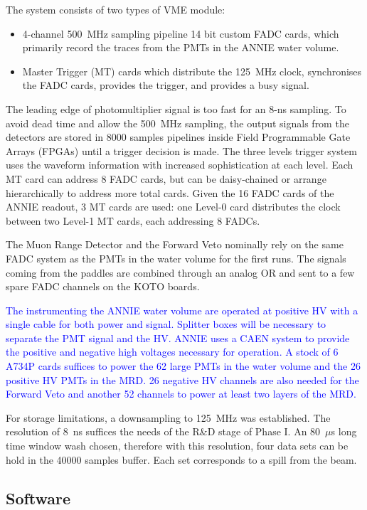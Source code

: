 The system consists of two types of VME module:
\begin{itemize}
  \item 4-channel 500~MHz sampling pipeline 14 bit custom FADC cards, which primarily record %
    the traces from the PMTs in the ANNIE water volume.
  \item Master Trigger (MT) cards which distribute the 125~MHz clock, synchronises the FADC %
    cards, provides the trigger, and provides a busy signal.
\end{itemize}

The leading edge of photomultiplier signal is too fast for an 8-ns sampling.
To avoid dead time and allow the 500~MHz sampling, the output signals from the detectors %
are stored in 8000 samples pipelines inside Field Programmable Gate Arrays (FPGAs) until %
a trigger decision is made.
The three levels trigger system uses the waveform information with increased %
sophistication at each level.
Each MT card can address 8 FADC cards, but can be daisy-chained or arrange hierarchically to %
address more total cards.
Given the 16 FADC cards of the ANNIE readout, 3 MT cards are used: %
one Level-0 card distributes the clock between two Level-1 MT cards, each addressing 8 FADCs.

The Muon Range Detector and the Forward Veto nominally rely on the same FADC system as %
the PMTs in the water volume for the first runs.
The signals coming from the paddles are combined through an analog OR and sent to a %
few spare FADC channels on the KOTO boards. 

\textcolor{blue}{
The instrumenting the ANNIE water volume are operated at positive HV with a %
single cable for both power and signal.
Splitter boxes will be necessary to separate the PMT signal and the HV.
ANNIE uses a CAEN system to provide the positive and negative high voltages necessary for operation. 
A stock of 6 A734P cards suffices to power the 62 large PMTs in the water volume %
and the 26 positive HV PMTs in the MRD.
26 negative HV channels are also needed for the Forward Veto and another 52 channels to power %
at least two layers of the MRD.
}

For storage limitations, a downsampling to 125~MHz was established.
The resolution of 8~ns suffices the needs of the R\&D stage of Phase I.
An 80~$\mu$s long time window wash chosen, therefore with this resolution, four data sets can be %
hold in the 40000 samples buffer.
Each set corresponds to a spill from the beam.

\subsection{Software}

